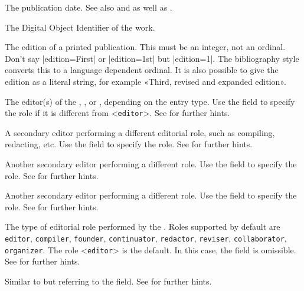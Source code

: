 \documentclass{ltxdockit}[2011/03/25]
\begin{document}
\begin{fieldlist}

The publication date. See also  and  as well as .


The Digital Object Identifier of the work.


The edition of a printed publication. This must be an integer, not an ordinal. Don't say |edition={First}| or |edition={1st}| but |edition={1}|. The bibliography style converts this to a language dependent ordinal. It is also possible to give the edition as a literal string, for example «Third, revised and expanded edition».


The editor(s) of the , , or , depending on the entry type. Use the  field to specify the role if it is different from <\texttt{editor}>. See  for further hints.


A secondary editor performing a different editorial role, such as compiling, redacting, etc. Use the  field to specify the role. See  for further hints.


Another secondary editor performing a different role. Use the  field to specify the role. See  for further hints.


Another secondary editor performing a different role. Use the  field to specify the role. See  for further hints.


The type of editorial role performed by the . Roles supported by default are \texttt{editor}, \texttt{compiler}, \texttt{founder}, \texttt{continuator}, \texttt{redactor}, \texttt{reviser}, \texttt{collaborator}, \texttt{organizer}. The role <\texttt{editor}> is the default. In this case, the field is omissible. See  for further hints.


Similar to  but referring to the  field. See  for further hints.


\end{fieldlist}
\end{document}
